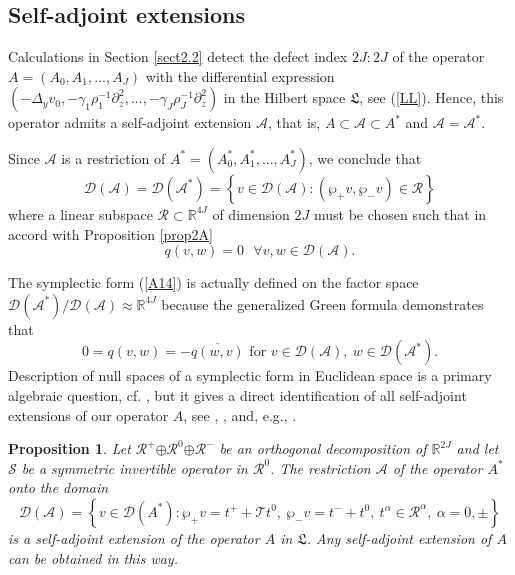 \documentclass[11pt]{article}%
\newtheorem{proposition}[theorem]{Proposition}
\numberwithin{equation}{section}
\begin{document}
\subsection{Self-adjoint extensions\label{sect2.3}}

Calculations in Section \ref{sect2.2} detect the defect index $2J:2J$ of the
operator $A=(A_{0},A_{1},...,A_{J})$ with the differential expression
$(-\Delta_{y}v_{0},-\gamma_{1}\rho_{1}^{-1}\partial_{z}^{2},...,-\gamma
_{J}\rho_{J}^{-1}\partial_{z}^{2})$ in the Hilbert space $\mathfrak{L}$, see
(\ref{LL}). Hence, this operator admits a self-adjoint extension $\mathcal{A}%
$, that is, $A\subset\mathcal{A}\subset A^{\ast}$ and $\mathcal{A}%
=\mathcal{A}^{\ast}$.

Since $\mathcal{A}$ is a restriction of $A^{\ast}=(A_{0}^{\ast},A_{1}^{\ast
},...,A_{J}^{\ast})$, we conclude that%
\begin{equation}
\mathcal{D}(\mathcal{A})=\mathcal{D}(\mathcal{A}^{\ast})=\left\{
v\in\mathcal{D}(\mathcal{A}):(\wp_{+}v,\wp_{-}v)\in\mathcal{R}\right\}
\label{A17}%
\end{equation}
where a linear subspace $\mathcal{R}\subset\mathbb{R}^{4J}$ of dimension $2J$
must be chosen such that in accord with Proposition \ref{prop2A}%
\begin{equation}
q(v,w)=0\ \ \ \forall v,w\in\mathcal{D}(\mathcal{A}). \label{A18}%
\end{equation}


The symplectic form (\ref{A14}) is actually defined on the factor space
$\mathcal{D}(\mathcal{A}^{\ast})/\mathcal{D}(\mathcal{A})\approx
\mathbb{R}^{4J}$ because the generalized Green formula demonstrates that%
\begin{equation}
0=q(v,w)=-\overline{q(w,v)}\text{ \ for }v\in\mathcal{D}(\mathcal{A}%
),\ w\in\mathcal{D}(\mathcal{A}^{\ast}). \label{A19}%
\end{equation}
Description of null spaces of a symplectic form in Euclidean space is a
primary algebraic question, cf. \cite{Leng}, but it gives a direct
identification of all self-adjoint extensions of our operator $A$, see
\cite{BeFa}, \cite{Rofe}, \cite{Yves} and, e.g., \cite{Pav, Pank, na239}.

\begin{proposition}
\label{prop3A}Let $\mathcal{R}^{+}\mathcal{\oplus R}^{0}\mathcal{\oplus R}%
^{-}$ be an orthogonal decomposition of $\mathbb{R}^{2J}$ and let
$\mathcal{S}$ be a symmetric invertible operator in $\mathcal{R}^{0}$. The
restriction $\mathcal{A}$ of the operator $A^{\ast}$ onto the domain%
\begin{equation}
\mathcal{D}(\mathcal{A})=\left\{  v\in\mathcal{D}(A^{\ast}):\wp_{+}%
v=t^{+}+\mathcal{T}t^{0},\ \wp_{-}v=t^{-}+t^{0},\ t^{\alpha}\in\mathcal{R}%
^{\alpha},\ \alpha=0,\pm\right\}  \label{A20}%
\end{equation}
is a self-adjoint extension of the operator $A$ in $\mathfrak{L}$. Any
self-adjoint extension of $A$ can be obtained in this way.
\end{proposition}
\end{document}
